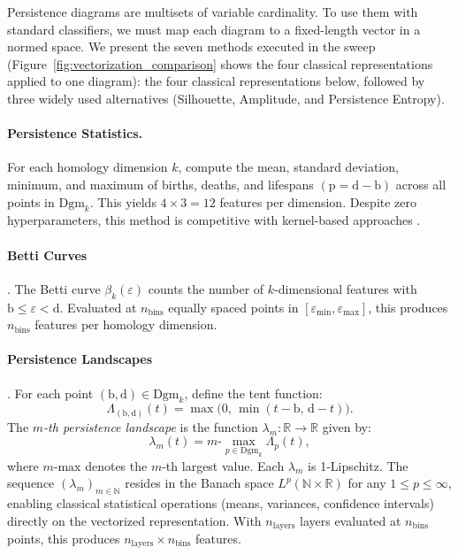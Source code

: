\documentclass[12pt, a4paper]{report}
\newcommand{\Dgm}{\mathrm{Dgm}}
\newcommand{\birth}{\mathrm{b}}
\newcommand{\death}{\mathrm{d}}
\newcommand{\pers}{\mathrm{p}}
\newcommand{\Betti}{\beta}
\newcommand{\R}{\mathbb{R}}
\newcommand{\N}{\mathbb{N}}
\theoremstyle{definition}
\theoremstyle{plain}
\theoremstyle{remark}
\begin{document}
Persistence diagrams are multisets of variable cardinality. To use
them with standard classifiers, we must map each diagram to a
fixed-length vector in a normed space. We present the seven methods
executed in the sweep (Figure~\ref{fig:vectorization_comparison}
shows the four classical representations applied to one diagram): the four classical representations below,
followed by three widely used alternatives (Silhouette, Amplitude,
and Persistence Entropy).

\paragraph{Persistence Statistics.}
For each homology dimension $k$, compute the mean, standard
deviation, minimum, and maximum of births, deaths, and lifespans
$(\pers = \death - \birth)$ across all points in $\Dgm_k$. This
yields $4 \times 3 = 12$ features per dimension. Despite zero
hyperparameters, this method is competitive with kernel-based
approaches \cite{ali2023}.

\paragraph{Betti Curves} \cite{chung2022}.
The Betti curve $\Betti_k(\varepsilon)$ counts the number of
$k$-dimensional features with $\birth \le \varepsilon < \death$.
Evaluated at $n_{\text{bins}}$ equally spaced points in
$[\varepsilon_{\min}, \varepsilon_{\max}]$, this produces
$n_{\text{bins}}$ features per homology dimension.

\paragraph{Persistence Landscapes} \cite{bubenik2015}.
For each point $(\birth, \death) \in \Dgm_k$, define the tent
function:
\begin{equation}
  \Lambda_{(\birth,\death)}(t) = \max\!\bigl(0,\,
  \min(t - \birth,\, \death - t)\bigr).
  \label{eq:tent}
\end{equation}
The \emph{$m$-th persistence landscape} is the function
$\lambda_m: \R \to \R$ given by:
\begin{equation}
  \lambda_m(t) = m\text{-}\!\max_{p \in \Dgm_k} \Lambda_p(t),
  \label{eq:landscape}
\end{equation}
where $m\text{-max}$ denotes the $m$-th largest value. Each
$\lambda_m$ is 1-Lipschitz. The sequence $(\lambda_m)_{m \in \N}$
resides in the Banach space $L^p(\N \times \R)$ for any
$1 \le p \le \infty$, enabling classical statistical operations
(means, variances, confidence intervals) directly on the vectorized
representation. With $n_{\text{layers}}$ layers evaluated at
$n_{\text{bins}}$ points, this produces $n_{\text{layers}} \times
n_{\text{bins}}$ features.
\end{document}
